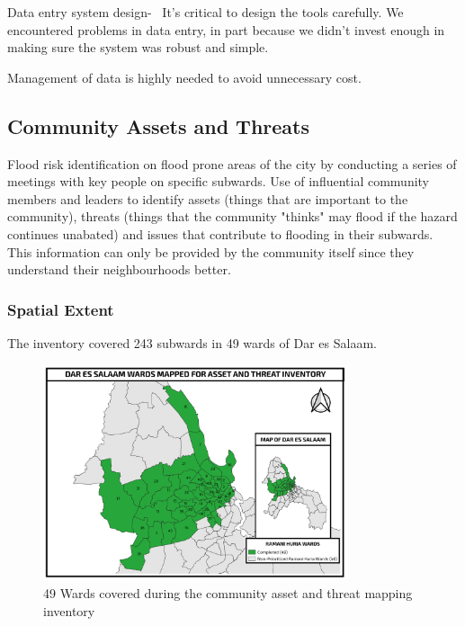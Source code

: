 \documentclass[a4paper,12pt,twoside]{article}
\begin{document}
{\color{RHblue}Data entry system design-}
\
It’s critical to design the tools carefully. We encountered problems in data entry, in part because we didn’t invest enough in making sure the system was robust and simple.

Management of data is highly needed to avoid unnecessary cost.

\newpage

\subsection{Community Assets and Threats}

\begin{multicols}{2}
Flood risk identification on flood prone areas of the city by conducting a series of meetings with key people on specific subwards. Use of influential community members and leaders to identify assets (things that are important to the community), threats (things that the community "thinks" may flood if the hazard continues unabated) and issues that contribute to flooding in their subwards. This information can only be provided by the community itself since they understand their neighbourhoods better.
\end{multicols}

\subsubsection{Spatial Extent}
The inventory covered  243 subwards in 49 wards of Dar es Salaam. 
\begin{figure}[h]
  \color{RHgreen}\caption{49 Wards covered during the community asset and threat mapping inventory}
  \centering
  \includegraphics[width=0.8\textwidth]{images/Asset&Threat.png}
\end{figure}
\end{document}
